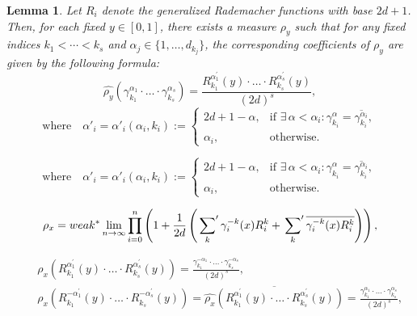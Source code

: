 \documentclass[10pt,a4paper]{amsart}
\newtheorem{lemma}{Lemma}
\begin{document}
	\begin{lemma} \label{muy}
Let $R_i$ denote the generalized Rademacher functions with base $2d+1$. Then, for each fixed $y \in [0,1]$, there exists a measure $\rho_y$ such that for any fixed indices $k_1 < \cdots < k_s$ and $\alpha_j \in \{1, \ldots, d_{k_j}\}$, the corresponding coefficients of $\rho_y$ are given by the following formula:
		\begin{equation}  \label{muycoef}
			\widehat{\rho_y}( \gamma_{k_1}^{\alpha_1} \cdot \ldots \cdot \gamma_{k_s}^{\alpha_s}) = \frac{ R_{k_1}^{\alpha_1^{\prime}}(y) \cdot \ldots \cdot R_{k_s}^{\alpha_s^{\prime}}(y)}{(2d)^{s}},   \end{equation}
		\begin{equation} \label{alpha'}
			\text{where} \quad \alpha'_i = \alpha'_i(\alpha_i, k_i) := 
			\begin{cases} 
				2d+1-\alpha, & \text{if } \exists\, \alpha < \alpha_i : \gamma_{k_i}^{\alpha} = \overline{\gamma_{k_i}^{\alpha_i}}, \\ 
				\alpha_i, & \text{otherwise}.
			\end{cases} 
		\end{equation}
	\end{lemma}	

		\begin{equation} 
			\text{where} \quad \alpha'_i = \alpha'_i(\alpha_i, k_i) := 
			\begin{cases} 
				2d+1-\alpha, & \text{if } \exists\, \alpha < \alpha_i : \gamma_{k_i}^{\alpha} = \overline{\gamma_{k_i}^{\alpha_i}}, \\ 
				\alpha_i, & \text{otherwise}.
			\end{cases} 
		\end{equation}

	\begin{equation} \label{rho_x}
		\rho_x =  weak^*\lim_{n \rightarrow\infty} \prod_{i=0}^{n} \left( 1 + \frac{1}{2d}\left( \sideset{}{'}{\sum}_{k} \gamma_i^{-k}(x) R_i^{k}  + \sideset{}{'}{\sum}_{k} \overline{\gamma_i^{-k}(x) R_i^{k}}\right) \right),
	\end{equation}

	\begin{equation} \label{rhox} 
		\begin{split}
			& \quad \widehat{\rho_x}(R_{k_1}^{\alpha_1^{\prime}}(y) \cdot \ldots \cdot R_{k_s}^{\alpha_s^{\prime}}(y)) = \frac{\gamma_{k_1}^{-\alpha_1} \cdot \ldots \cdot \gamma_{k_s}^{-\alpha_s}}{(2d)^{s}}, \\
			& \quad \widehat{\rho_x}(R_{k_1}^{-\alpha_1^{\prime}}(y) \cdot \ldots \cdot R_{k_s}^{-\alpha_s^{\prime}}(y)) = \overline{\widehat{\rho_x}(R_{k_1}^{\alpha_1^{\prime}}(y) \cdot \ldots \cdot R_{k_s}^{\alpha_s^{\prime}}(y))} = \frac{\gamma_{k_1}^{\alpha_1} \cdot \ldots \cdot \gamma_{k_s}^{\alpha_s}}{(2d)^{s}}, 
		\end{split} 
	\end{equation}
\end{document}
